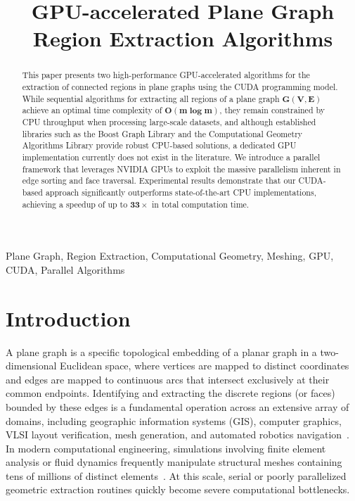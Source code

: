 \documentclass[conference]{IEEEtran}
\begin{document}
\title{GPU-accelerated Plane Graph Region Extraction Algorithms}

\author{
}

\maketitle

\begin{abstract}
This paper presents two high-performance GPU-accelerated algorithms for the extraction of connected regions in plane graphs using the CUDA programming model. While sequential algorithms for extracting all regions of a plane graph $\bm{G(V, E)}$ achieve an optimal time complexity of $\bm{O(m \log m)}$, they remain constrained by CPU throughput when processing large-scale datasets, and although established libraries such as the Boost Graph Library and the Computational Geometry Algorithms Library provide robust CPU-based solutions, a dedicated GPU implementation currently does not exist in the literature. We introduce a parallel framework that leverages NVIDIA GPUs to exploit the massive parallelism inherent in edge sorting and face traversal.  Experimental results demonstrate that our CUDA-based approach significantly outperforms state-of-the-art CPU implementations, achieving a speedup of up to $\bm{33\times}$ in total computation time.
\end{abstract}

\begin{IEEEkeywords}
Plane Graph, Region Extraction,  Computational Geometry, Meshing, GPU, CUDA, Parallel Algorithms
\end{IEEEkeywords}

\section{Introduction}

A plane graph is a specific topological embedding of a planar graph in a two-dimensional Euclidean space, where vertices are mapped to distinct coordinates and edges are mapped to continuous arcs that intersect exclusively at their common endpoints. Identifying and extracting the discrete regions (or faces) bounded by these edges is a fundamental operation across an extensive array of domains, including geographic information systems (GIS), computer graphics, VLSI layout verification, mesh generation, and automated robotics navigation~\cite{ANTOLIN2023103448,DEMAGALHAES2020102801,10.1145/3139958.3140001}. In modern computational engineering, simulations involving finite element analysis or fluid dynamics frequently manipulate structural meshes containing tens of millions of distinct elements~\cite{Lintermann2021,LINTERMANN2014131,electronics14153151}. At this scale, serial or poorly parallelized geometric extraction routines quickly become severe computational bottlenecks.
\end{document}
